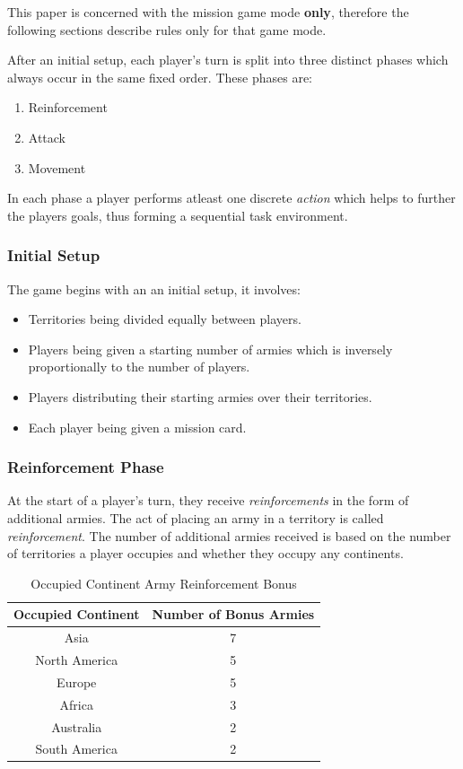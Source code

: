 \documentclass[parskip]{cs4rep}
\begin{document}
This paper is concerned with the mission game mode \textbf{only}, therefore the following sections describe rules only for that game mode.

After an initial setup, each player's turn is split into three distinct phases which always occur in the same fixed order. These phases are:

\begin{enumerate}
\item
Reinforcement
\item
Attack
\item
Movement
\newline
\end{enumerate}

In each phase a player performs atleast one discrete \textit{action} which helps to further the players goals, thus forming a sequential task environment.

\subsubsection{Initial Setup}

The game begins with an an initial setup, it involves:

\begin{itemize}
\item
Territories being divided equally between players.
\item
Players being given a starting number of armies which is inversely proportionally to the number of players.
\item
Players distributing their starting armies over their territories.
\item
Each player being given a mission card.
\end{itemize}

\subsubsection{Reinforcement Phase}

At the start of a player's turn, they receive \textit{reinforcements} in the form of additional armies. The act of placing an army in a territory is called \textit{reinforcement}.  The number of additional armies received is based on the number of territories a player occupies and whether they occupy any continents.
\newline

\begin{table}[ht]
\centering
\begin{tabular}{|c|c|}
\hline 
\textbf{Occupied Continent} & \textbf{Number of Bonus Armies} \\ 
\hline 
Asia & 7 \\ 
\hline 
North America & 5 \\ 
\hline 
Europe & 5 \\ 
\hline 
Africa & 3 \\
\hline
Australia & 2 \\
\hline  
South America & 2 \\
\hline 
\end{tabular}
\caption{Occupied Continent Army Reinforcement Bonus}
\label{table:continent-bonus}
\end{table}
\end{document}
